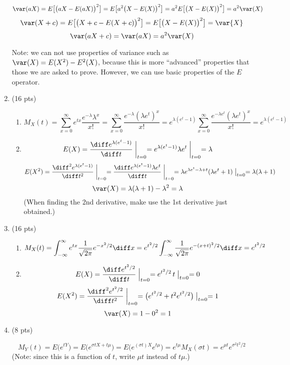 \documentclass[12pt]{article}
\begin{document}
\begin{enumerate}
\[
\var(aX)
= E\bigl[\bigl(aX - E(aX)\bigr)^2\big]
= E\bigl[a^2\bigl(X - E(X)\bigr)^2\big]
= a^2 E\bigl[\bigl(X - E(X)\bigr)^2\big]
= a^2\var(X)
\]
\[
\var(X + c)
= E\bigl[\bigl(X + c - E(X + c)\bigr)^2\bigr]
= E\bigl[\bigl(X - E(X)\bigr)^2\bigr]
= \var{X}
\]
\[
\var(aX + c)
= \var(aX)
= a^2\var(X)
\]

Note: we can not use properties of variance such as
$\var(X) = E(X^2) - E^2(X)$,
because this is more ``advanced'' properties that those
we are asked to prove.
However, we can use basic properties of the $E$ operator.

\item (16 pts)

\begin{enumerate}
\item
\[
M_X(t)
= \sum_{x=0}^{\infty} e^{tx} \frac{e^{-\lambda} \lambda^x}{x!}
= \sum_{x=0}^{\infty} \frac{e^{-\lambda} (\lambda e^t)^x}{x!}
= e^{\lambda(e^t - 1)} \sum_{x=0}^{\infty} \frac{e^{-\lambda e^t} (\lambda e^t)^x}{x!}
= e^{\lambda (e^t - 1)}
\]
\item
\[
E(X)
= \frac{\diff e^{\lambda(e^t - 1)}}{\diff t} \biggm|_{t=0}
= e^{\lambda(e^t - 1)} \lambda e^t \biggm|_{t=0}
= \lambda
\]
\[
E(X^2)
= \frac{\diff^2 e^{\lambda(e^t - 1)}}{\diff t^2} \biggm|_{t=0}
= \frac{\diff e^{\lambda(e^t - 1)} \lambda e^t}{\diff t} \biggm|_{t=0}
= \lambda e^{\lambda e^t - \lambda + t} (\lambda e^t + 1) \bigm|_{t=0}
= \lambda (\lambda + 1)
\]
\[
\var(X)
= \lambda(\lambda + 1) - \lambda^2 = \lambda
\]
(When finding the 2nd derivative,
make use the 1st derivative just obtained.)
\end{enumerate}


\item (16 pts)

\begin{enumerate}
\item
\[
M_X(t)
= \int_{-\infty}^{\infty}
    e^{tx}
    \frac{1}{\sqrt{2\pi}}
    e^{-x^2/2}
    \diff x
= e^{t^2/2} \int_{-\infty}^{\infty} \frac{1}{\sqrt{2\pi}}
    e^{-(x + t)^2 / 2}
    \diff x
= e^{t^2/2}
\]
\item
\[
E(X)
= \frac{\diff e^{t^2/2}}{\diff t} \Bigm|_{t=0}
= e^{t^2/2}\, t \bigm|_{t=0}
= 0
\]
\[
E(X^2)
= \frac{\diff^2 e^{t^2/2}}{\diff t^2} \biggm|_{t=0}
= \bigl(e^{t^2/2} + t^2 e^{t^2/2}\bigr) \bigm|_{t=0}
= 1
\]
\[
\var(X) = 1 - 0^2 = 1
\]
\end{enumerate}

\item (8 pts)

\[
M_Y(t)
= E\bigl(e^{tY}\bigr)
= E\bigl(e^{\sigma t X + t\mu}\bigr)
= E\bigl(e^{(\sigma t)X} e^{t\mu}\bigr)
= e^{t\mu} M_X(\sigma t)
= e^{\mu t} e^{\sigma^2 t^2/2}
\]
(Note:
since this is a function of $t$, write $\mu t$ instead of $t\mu$.)


\end{enumerate}
\end{document}
